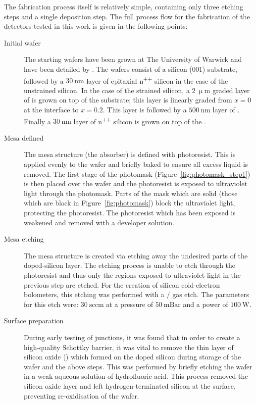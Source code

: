 \par 
The fabrication process itself is relatively simple, containing only three etching steps and a single deposition step. The full process flow for the fabrication of the detectors tested in this work is given in the following points:
\begin{description}
\item[Initial wafer] The starting wafers have been grown at The University of Warwick and have been detailed by \textcite{Muhonen2011}. The wafers consist of a silicon (001) substrate, followed by a $30~\mathrm{nm}$ layer of epitaxial n\textsuperscript{++} silicon in the case of the unstrained silicon. In the case of the strained silicon, a $2~\mathrm{\upmu m}$ graded layer of  is grown on top of the substrate; this layer is linearly graded from $x=0$ at the interface to $x=0.2$. This layer is followed by a $500~\mathrm{nm}$ layer of . Finally a $30~\mathrm{nm}$ layer of n\textsuperscript{++} silicon is grown on top of the .
\item[Mesa defined] The mesa structure (the absorber) is defined with photoresist. This is applied evenly to the wafer and briefly baked to ensure all excess liquid is removed. The first stage of the photomask (Figure~\ref{fig:photomask_step1}) is then placed over the wafer and the photoresist is exposed to ultraviolet light through the photomask. Parts of the mask which are solid (those which are black in Figure~\ref{fig:photomask}) block the ultraviolet light, protecting the photoresist. The photoresist which has been exposed is weakened and removed with a developer solution.
\item[Mesa etching] The mesa structure is created via etching away the undesired parts of the doped-silicon layer. The etching process is unable to etch through the photoresist and thus only the regions exposed to ultraviolet light in the previous step are etched. For the creation of silicon cold-electron bolometers, this etching was performed with a / gas etch. The parameters for this etch were: $30~\mathrm{sccm}$ at a pressure of $50~\mathrm{mBar}$ and a power of $100~\mathrm{W}$.
\item[Surface preparation] During early testing of junctions, it was found that in order to create a high-quality Schottky barrier, it was vital to remove the thin layer of silicon oxide () which formed on the doped silicon during storage of the wafer and the above steps. This was performed by briefly etching the wafer in a weak aqueous solution of hydrofluoric acid. This process removed the silicon oxide layer and left hydrogen-terminated silicon at the surface, preventing re-oxidisation of the wafer.

\end{description}
